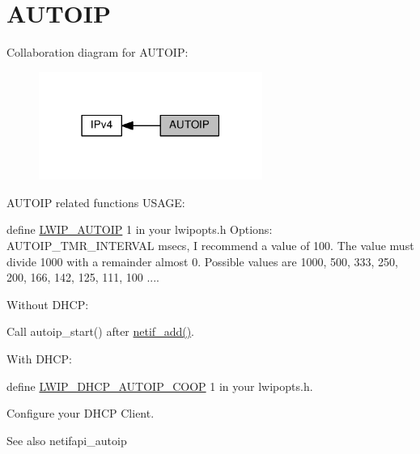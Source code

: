 \hypertarget{group__autoip}{}\section{A\+U\+T\+O\+IP}
\label{group__autoip}
Collaboration diagram for A\+U\+T\+O\+IP\+:
\nopagebreak
\begin{figure}[H]
\begin{center}
\leavevmode
\includegraphics[width=207pt]{group__autoip}
\end{center}
\end{figure}
A\+U\+T\+O\+IP related functions U\+S\+A\+GE\+:

define \hyperlink{group__lwip__opts__autoip_gaaf1b3a089827223589baf1b7f4f57069}{L\+W\+I\+P\+\_\+\+A\+U\+T\+O\+IP} 1 in your lwipopts.\+h Options\+: A\+U\+T\+O\+I\+P\+\_\+\+T\+M\+R\+\_\+\+I\+N\+T\+E\+R\+V\+AL msecs, I recommend a value of 100. The value must divide 1000 with a remainder almost 0. Possible values are 1000, 500, 333, 250, 200, 166, 142, 125, 111, 100 ....

Without D\+H\+CP\+:
\begin{DoxyItemize}
\item Call autoip\+\_\+start() after \hyperlink{group__netif_gabde72af134ae7047a46ad7719d2a1ee9}{netif\+\_\+add()}.
\end{DoxyItemize}

With D\+H\+CP\+:
\begin{DoxyItemize}
\item define \hyperlink{group__lwip__opts__autoip_ga1a91e18dbb9777bc6e3963f52cb5f9fe}{L\+W\+I\+P\+\_\+\+D\+H\+C\+P\+\_\+\+A\+U\+T\+O\+I\+P\+\_\+\+C\+O\+OP} 1 in your lwipopts.\+h.
\item Configure your D\+H\+CP Client.
\end{DoxyItemize}

\begin{DoxySeeAlso}{See also}
netifapi\+\_\+autoip 
\end{DoxySeeAlso}
